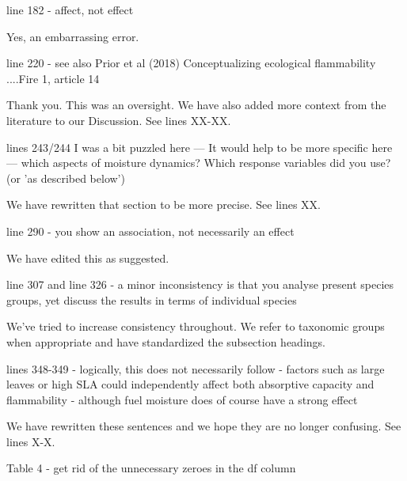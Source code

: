 \documentclass[letterpaper, 12pt]{letter}
\begin{document}
\begin{letter}{}
\begin{quoting}
line 182 - affect, not effect
\end{quoting}

Yes, an embarrassing error.

\begin{quoting}
  line 220 - see also Prior et al (2018) Conceptualizing ecological
  flammability ....Fire 1, article 14
\end{quoting}

Thank you. This was an oversight. We have also added more context from the
literature to our Discussion. See lines XX-XX.


\begin{quoting}
  lines 243/244 I was a bit puzzled here --- It would help to be more specific
  here --- which aspects of moisture dynamics? Which response variables did you
  use? (or 'as described below')
\end{quoting}

We have rewritten that section to be more precise.  See lines XX.

\begin{quoting}
line 290 - you show an association, not necessarily an effect
\end{quoting}

We have edited this as suggested.

\begin{quoting}
  line 307 and line 326 - a minor inconsistency is that you analyse present
  species groups, yet discuss the results in terms of individual species
\end{quoting}

We've tried to increase consistency throughout. We refer to taxonomic groups
when appropriate and have standardized the subsection headings.

\begin{quoting}
  lines 348-349 - logically, this does not necessarily follow - factors such as
  large leaves or high SLA could independently affect both absorptive capacity
  and flammability - although fuel moisture does of course have a strong effect
\end{quoting}

We have rewritten these sentences and we hope they are no longer confusing. See
lines X-X.

\begin{quoting}
Table 4 - get rid of the unnecessary zeroes in the df column
\end{quoting}


\end{letter}
\end{document}
